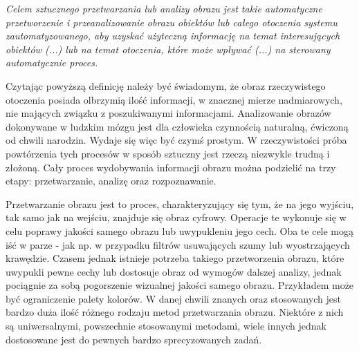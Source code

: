 \textit{Celem sztucznego przetwarzania lub analizy obrazu jest takie automatyczne przetworzenie i przeanalizowanie obrazu obiektów lub całego otoczenia systemu zautomatyzowanego, aby uzyskać użyteczną informację na temat interesujących obiektów (...) lub na temat otoczenia, które może wpływać (...) na sterowany automatycznie proces.}\cite{Tadeusiewicz}

Czytając powyższą definicję należy być świadomym, że obraz rzeczywistego otoczenia posiada olbrzymią ilość informacji, w znacznej mierze nadmiarowych, nie mających związku z poszukiwanymi informacjami. Analizowanie obrazów dokonywane w ludzkim mózgu jest dla człowieka czynnością naturalną, ćwiczoną od chwili narodzin. Wydaje się więc być czymś prostym. W rzeczywistości próba powtórzenia tych procesów w sposób sztuczny jest rzeczą niezwykle trudną i złożoną. Cały proces wydobywania informacji obrazu można podzielić na trzy etapy: przetwarzanie, analizę oraz rozpoznawanie.

Przetwarzanie obrazu jest to proces, charakteryzujący się tym, że na jego wyjściu, tak samo jak na wejściu, znajduje się obraz cyfrowy. Operacje te wykonuje się w celu poprawy jakości samego obrazu lub uwypukleniu jego cech. Oba te cele mogą iść w parze - jak np. w przypadku filtrów usuwających szumy lub wyostrzających krawędzie. Czasem jednak istnieje potrzeba takiego przetworzenia obrazu, które uwypukli pewne cechy lub dostosuje obraz od wymogów dalszej analizy, jednak pociągnie za sobą pogorszenie wizualnej jakości samego obrazu. Przykładem może być ograniczenie palety kolorów. W danej chwili znanych oraz stosowanych jest bardzo duża ilość różnego rodzaju metod przetwarzania obrazu. Niektóre z nich są uniwersalnymi, powszechnie stosowanymi metodami, wiele innych jednak dostosowane jest do pewnych bardzo sprecyzowanych zadań.

